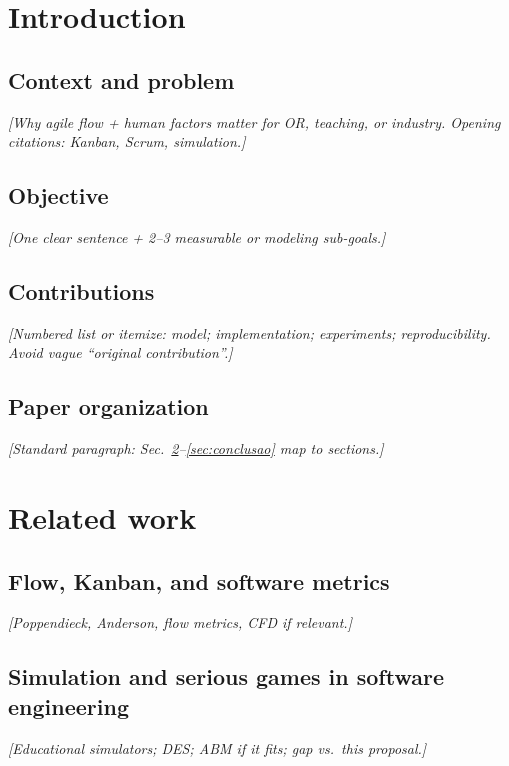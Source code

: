 
\section{Introduction}
\label{sec:introducao}

\subsection{Context and problem}
\textit{[Why agile flow + human factors matter for OR, teaching, or industry. Opening citations: Kanban, Scrum, simulation.]}

\subsection{Objective}
\textit{[One clear sentence + 2--3 measurable or modeling sub-goals.]}

\subsection{Contributions}
\textit{[Numbered list or itemize: model; implementation; experiments; reproducibility. Avoid vague ``original contribution''.]}

\subsection{Paper organization}
\textit{[Standard paragraph: Sec.~\ref{sec:relacionados}--\ref{sec:conclusao} map to sections.]}

\section{Related work}
\label{sec:relacionados}

\subsection{Flow, Kanban, and software metrics}
\textit{[Poppendieck, Anderson, flow metrics, CFD if relevant.]}

\subsection{Simulation and serious games in software engineering}
\textit{[Educational simulators; DES; ABM if it fits; gap vs.\ this proposal.]}

